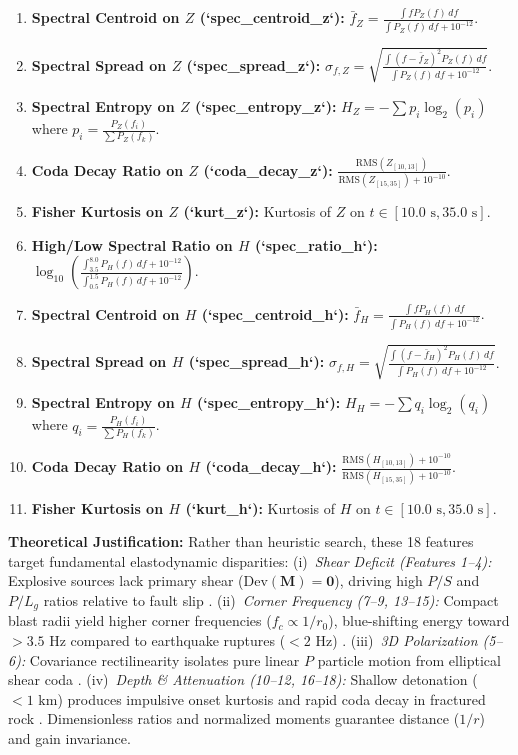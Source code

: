 \documentclass[11pt,a4paper]{article}
\begin{document}
\begin{enumerate}
    \item \textbf{Spectral Centroid on $Z$ (`spec\_centroid\_z`):} $\bar{f}_Z = \frac{\int f P_Z(f) \, df}{\int P_Z(f) \, df + 10^{-12}}$.
    \item \textbf{Spectral Spread on $Z$ (`spec\_spread\_z`):} $\sigma_{f, Z} = \sqrt{\frac{\int (f - \bar{f}_Z)^2 P_Z(f) \, df}{\int P_Z(f) \, df + 10^{-12}}}$.
    \item \textbf{Spectral Entropy on $Z$ (`spec\_entropy\_z`):} $H_Z = -\sum p_i \log_2(p_i)$ where $p_i = \frac{P_Z(f_i)}{\sum P_Z(f_k)}$.
    \item \textbf{Coda Decay Ratio on $Z$ (`coda\_decay\_z`):} $\frac{\text{RMS}(Z_{[10,13]})}{\text{RMS}(Z_{[15,35]}) + 10^{-10}}$.
    \item \textbf{Fisher Kurtosis on $Z$ (`kurt\_z`):} Kurtosis of $Z$ on $t \in [10.0\text{ s}, 35.0\text{ s}]$.
    \item \textbf{High/Low Spectral Ratio on $H$ (`spec\_ratio\_h`):} $\log_{10} \left( \frac{\int_{3.5}^{8.0} P_H(f) \, df + 10^{-12}}{\int_{0.5}^{1.5} P_H(f) \, df + 10^{-12}} \right)$.
    \item \textbf{Spectral Centroid on $H$ (`spec\_centroid\_h`):} $\bar{f}_H = \frac{\int f P_H(f) \, df}{\int P_H(f) \, df + 10^{-12}}$.
    \item \textbf{Spectral Spread on $H$ (`spec\_spread\_h`):} $\sigma_{f, H} = \sqrt{\frac{\int (f - \bar{f}_H)^2 P_H(f) \, df}{\int P_H(f) \, df + 10^{-12}}}$.
    \item \textbf{Spectral Entropy on $H$ (`spec\_entropy\_h`):} $H_H = -\sum q_i \log_2(q_i)$ where $q_i = \frac{P_H(f_i)}{\sum P_H(f_k)}$.
    \item \textbf{Coda Decay Ratio on $H$ (`coda\_decay\_h`):} $\frac{\text{RMS}(H_{[10,13]}) + 10^{-10}}{\text{RMS}(H_{[15,35]}) + 10^{-10}}$.
    \item \textbf{Fisher Kurtosis on $H$ (`kurt\_h`):} Kurtosis of $H$ on $t \in [10.0\text{ s}, 35.0\text{ s}]$.
\end{enumerate}

{\footnotesize
\noindent \textbf{Theoretical Justification:}
Rather than heuristic search, these 18 features target fundamental elastodynamic disparities:
(i)~\emph{Shear Deficit (Features 1--4):} Explosive sources lack primary shear ($\text{Dev}(\mathbf{M}) = \mathbf{0}$), driving high $P/S$ and $P/L_g$ ratios relative to fault slip \cite{walter1995}.
(ii)~\emph{Corner Frequency (7--9, 13--15):} Compact blast radii yield higher corner frequencies ($f_c \propto 1/r_0$), blue-shifting energy toward $>3.5\text{ Hz}$ compared to earthquake ruptures ($<2\text{ Hz}$) \cite{brune1970}.
(iii)~\emph{3D Polarization (5--6):} Covariance rectilinearity isolates pure linear $P$ particle motion from elliptical shear coda \cite{jurkevics1988}.
(iv)~\emph{Depth \& Attenuation (10--12, 16--18):} Shallow detonation ($<1\text{ km}$) produces impulsive onset kurtosis and rapid coda decay in fractured rock \cite{aki1975}.
Dimensionless ratios and normalized moments guarantee distance ($1/r$) and gain invariance.
\par}
\end{document}
